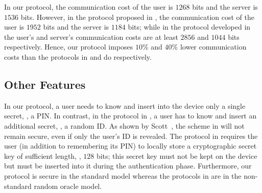 In our protocol, the communication cost of the user is $1268$ bits and the server is $1536$ bits. However, in the protocol proposed in \cite{WangW18},  the communication cost of the user is $1952$ bits and the server is  $1184$ bits; while in the protocol developed in \cite{JareckiJKSS21} the user's and server's communication costs are at least $2856$ and $1044$ bits respectively. Hence, our protocol imposes $10\%$ and $40\%$ lower communication costs than the protocols in \cite{WangW18} and \cite{JareckiJKSS21} do respectively.


\subsection{Other Features}

 In our protocol, a user needs to know and insert into the device only a single secret, \ie, a  PIN. In contrast, in the protocol in \cite{WangW18}, a user has to know and insert an additional secret, \ie, a random ID. As shown by Scott~\cite{Scott12a}, the scheme in \cite{WangW18} will not remain secure, even if only the user's ID is revealed. The protocol in \cite{JareckiJKSS21} requires the user (in addition to remembering its PIN) to locally store a cryptographic secret key of sufficient length, \eg, $128$ bits; this secret key must not be kept on the device but must be inserted into it during the authentication phase. 
 Furthermore, our protocol is secure in the standard model whereas the protocols in \cite{WangW18,JareckiJKSS21} are in the non-standard random oracle model. 

